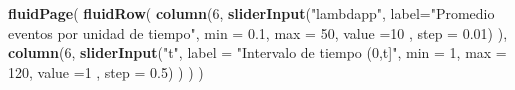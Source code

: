 \documentclass[]{book}
\newenvironment{Shaded}{\begin{snugshade}}{\end{snugshade}}
\newcommand{\DataTypeTok}[1]{\textcolor[rgb]{0.13,0.29,0.53}{#1}}
\newcommand{\DecValTok}[1]{\textcolor[rgb]{0.00,0.00,0.81}{#1}}
\newcommand{\FloatTok}[1]{\textcolor[rgb]{0.00,0.00,0.81}{#1}}
\newcommand{\KeywordTok}[1]{\textcolor[rgb]{0.13,0.29,0.53}{\textbf{#1}}}
\newcommand{\NormalTok}[1]{#1}
\newcommand{\StringTok}[1]{\textcolor[rgb]{0.31,0.60,0.02}{#1}}
\begin{document}
\begin{Shaded}
\begin{Highlighting}[]
\KeywordTok{fluidPage}\NormalTok{(}
\KeywordTok{fluidRow}\NormalTok{(}
  \KeywordTok{column}\NormalTok{(}\DecValTok{6}\NormalTok{,}
         \KeywordTok{sliderInput}\NormalTok{(}\StringTok{"lambdapp"}\NormalTok{, }\DataTypeTok{label=}\StringTok{"Promedio eventos por unidad de tiempo"}\NormalTok{,}
              \DataTypeTok{min =} \FloatTok{0.1}\NormalTok{, }\DataTypeTok{max =} \DecValTok{50}\NormalTok{, }\DataTypeTok{value =}\DecValTok{10}\NormalTok{ , }\DataTypeTok{step =} \FloatTok{0.01}\NormalTok{)}
\NormalTok{         ),}
  \KeywordTok{column}\NormalTok{(}\DecValTok{6}\NormalTok{,}
          \KeywordTok{sliderInput}\NormalTok{(}\StringTok{"t"}\NormalTok{, }\DataTypeTok{label =} \StringTok{"Intervalo de tiempo (0,t]"}\NormalTok{,}
                     \DataTypeTok{min =} \DecValTok{1}\NormalTok{, }\DataTypeTok{max =} \DecValTok{120}\NormalTok{, }\DataTypeTok{value =}\DecValTok{1}\NormalTok{ , }\DataTypeTok{step =} \FloatTok{0.5}\NormalTok{)}
\NormalTok{         )}
\NormalTok{ )}
\NormalTok{)}



\end{Highlighting}
\end{Shaded}
\end{document}
